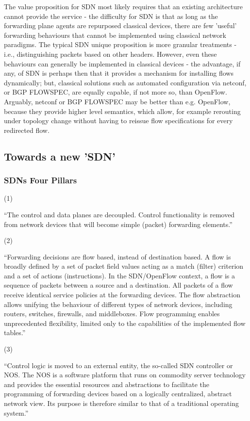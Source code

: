 The value proposition for SDN most likely requires that an existing architecture cannot provide the service - the difficulty for SDN is that as long as the forwarding plane agents are repurposed classical devices, there are few 'useful' forwarding behaviours that cannot be implemented using classical network paradigms.  The typical SDN unique proposition is more granular treatments - i.e., distinguishing packets based on other headers.  However, even these behaviours can generally be implemented in classical devices - the advantage, if any, of SDN is  perhaps then that it provides a mechanism for installing flows dynamically; but, classical solutions such as automated configuration via netconf, or BGP FLOWSPEC, are equally capable, if not more so, than OpenFlow.  Arguably, netconf or BGP FLOWSPEC may be better than e.g. OpenFlow, because they provide higher level semantics, which allow, for example rerouting under topology change without having to reissue flow specifications for every redirected flow.

\subsection{Towards a new 'SDN'}

\subsubsection{SDNs Four Pillars}

(1)

“The control and data planes are decoupled. Control functionality is removed from
network devices that will become simple (packet) forwarding elements.”

(2)

“Forwarding decisions are flow based, instead of destination based. A flow is broadly
defined by a set of packet field values acting as a match (filter) criterion and a set of
actions (instructions). In the SDN/OpenFlow context, a flow is a sequence of packets
between a source and a destination. All packets of a flow receive identical service
policies at the forwarding devices. The flow abstraction allows unifying the behaviour of different types of network devices, including routers, switches, firewalls, and middleboxes.
Flow programming enables unprecedented flexibility, limited only to the capabilities of
the implemented flow tables.”

(3)

“Control logic is moved to an external entity, the so-called SDN controller or NOS. The
NOS is a software platform that runs on commodity server technology and provides the
essential resources and abstractions to facilitate the programming of forwarding devices
based on a logically centralized, abstract network view. Its purpose is therefore similar
to that of a traditional operating system.”

